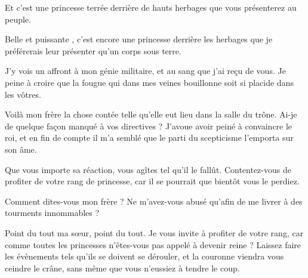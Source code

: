 \begin{drama}
  \elaspeaks Et c’est une princesse terrée derrière de hauts herbages que vous présenterez au peuple.

  \roispeaks Belle et puissante \princesse{}, c’est encore une princesse derrière les herbages que je préférerais leur présenter qu’un corps sous terre.

  \elaspeaks J’y vois un affront à mon génie militaire, et au sang que j’ai reçu de vous. Je peine à croire que la fougue qui dans mes veines bouillonne soit si placide dans les vôtres.


\end{drama}

\scene

\StageDirII{\elena, \ela}

%

\begin{drama}
  \elaspeaks Voilà mon frère la chose contée telle qu’elle eut lieu dans la salle du trône. Ai-je de quelque façon manqué à vos directives ? J’avoue avoir peiné à convaincre le roi, et en fin de compte il m’a semblé que le parti du scepticisme l’emporta sur son âme.

  \elenaspeaks Que vous importe sa réaction, vous agîtes tel qu’il le fallût. Contentez-vous de profiter de votre rang de princesse, car il se pourrait que bientôt vous le perdiez.

  \elaspeaks Comment dites-vous mon frère ? Ne m’avez-vous abusé qu’afin de me livrer à des tourments innommables ?

  \elenaspeaks Point du tout ma sœur, point du tout. Je vous invite à profiter de votre rang, car comme toutes les princesses n’êtes-vous pas appelé à devenir reine ? Laissez faire les évènements tels qu’ils se doivent se dérouler, et la couronne viendra vous ceindre le crâne, sans même que vous n’eussiez à tendre le coup.
\end{drama}

\scene

\StageDirII{\reine, \roi}


